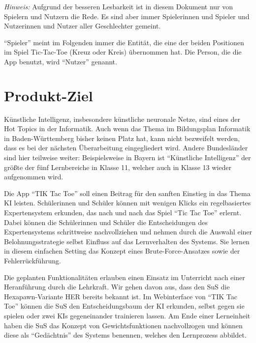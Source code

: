 \documentclass[titlepage]{scrartcl}
\title{\TicTacToe}
\subtitle{Product Backlog}
\date{Stand: \today}
\author{Jonas, Luis, Leonid}
\newcommand{\TicTacToe}{TI\reflectbox K Tac Toe}
\begin{document}
\maketitle

\emph{Hinweis:} Aufgrund der besseren Lesbarkeit ist in diesem Dokument nur von Spielern und Nutzern die Rede.
Es sind aber immer Spielerinnen und Spieler und Nutzerinnen und Nutzer aller Geschlechter gemeint.

"`Spieler"' meint im Folgenden immer die Entität, die eine der beiden Positionen im Spiel Tic-Tac-Toe (Kreuz oder Kreis) übernommen hat.
Die Person, die die App benutzt, wird "`Nutzer"' genannt.

\section{Produkt-Ziel}%
Künstliche Intelligenz, insbesondere künstliche neuronale Netze, sind eines der Hot Topics in der Informatik.
Auch wenn das Thema im Bildungsplan Informatik in Baden-Württemberg bisher keinen Platz hat, kann nicht bezweifelt werden, dass es bei der nächsten Überarbeitung eingegliedert wird.
Andere Bundesländer sind hier teilweise weiter: Beispielsweise in Bayern ist "`Künstliche Intelligenz"' der größte der fünf Lernbereiche in Klasse 11, welcher auch in Klasse 13 wieder aufgenommen wird.

Die App "`\TicTacToe"' soll einen Beitrag für den sanften Einstieg in das Thema KI leisten.
Schülerinnen und Schüler können mit wenigen Klicks ein regelbasiertes Expertensystem erkunden, das nach und nach das Spiel "`Tic Tac Toe"' erlernt.
Dabei können die Schülerinnen und Schüler die Entscheidungen des Expertensystems schrittweise nachvollziehen und nehmen durch die Auswahl einer Belohnungsstrategie selbst Einfluss auf das Lernverhalten des Systems.
Sie lernen in diesem einfachen Setting das Konzept eines Brute-Force-Ansatzes sowie der Fehlerrückführung.

Die geplanten Funktionalitäten erlauben einen Einsatz im Unterricht nach einer Heranführung durch die Lehrkraft.
Wir gehen davon aus, dass den SuS die Hexapawn-Variante HER bereits bekannt ist.
Im Webinterface von "`\TicTacToe"' können die SuS den Entscheidungsbaum der KI erkunden, selbst gegen sie spielen oder zwei KIs gegeneinander trainieren lassen.
Am Ende einer Lerneinheit haben die SuS das Konzept von Gewichtsfunktionen nachvollzogen und können diese als "`Gedächtnis"' des Systems benennen, welches den Lernprozess abbildet.
\end{document}
